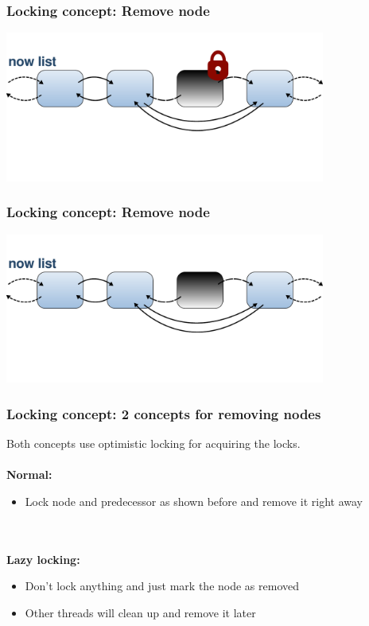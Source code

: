 \documentclass{beamer}
\begin{document}
\begin{frame}
\frametitle{Locking concept: Remove node}
\begin{center}
	\includegraphics[height=140pt]{remove6.pdf}
\end{center}
\end{frame}

\begin{frame}
\frametitle{Locking concept: Remove node}
\begin{center}
	\includegraphics[height=140pt]{remove7.pdf}
\end{center}
\end{frame}


\begin{frame}
\frametitle{Locking concept: 2 concepts for removing nodes}
Both concepts use optimistic locking for acquiring the locks.\\
\quad\\
\textbf{Normal:}
\begin{itemize}
\item Lock node and predecessor as shown before and remove it right away
\end{itemize}
\quad\\ \quad \\
\textbf{Lazy locking:}
\begin{itemize}
\item Don't lock anything and just mark the node as removed
\item Other threads will clean up and remove it later
\end{itemize}

\end{frame}
\end{document}
